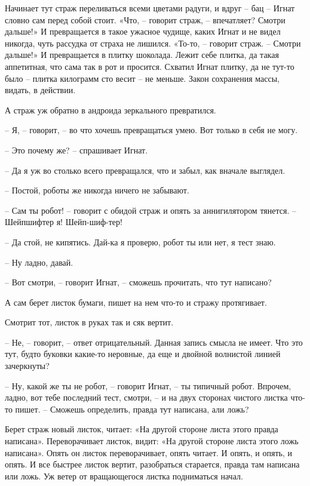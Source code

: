 \documentclass[ebook,oneside,final,openright]{memoir}
\begin{document}
Начинает тут страж переливаться всеми цветами радуги, и вдруг – бац – Игнат словно сам перед собой стоит. «Что, – говорит страж, – впечатляет? Смотри дальше!» И превращается в такое ужасное чудище, каких Игнат и не видел никогда, чуть рассудка от страха не лишился. «То-то, – говорит страж. – Смотри дальше!» И превращается в плитку шоколада. Лежит себе плитка, да такая аппетитная, что сама так в рот и просится. Схватил Игнат плитку, да не тут-то было – плитка килограмм сто весит – не меньше. Закон сохранения массы, видать, в действии. \par
\par
А страж уж обратно в андроида зеркального превратился. \par
– Я, – говорит, – во что хочешь превращаться умею. Вот только в себя не могу. \par
– Это почему же? – спрашивает Игнат.\par
– Да я уж во столько всего превращался, что и забыл, как вначале выглядел. \par
– Постой, роботы же никогда ничего не забывают. \par
– Сам ты робот! – говорит с обидой страж и опять за аннигилятором тянется. – Шейпшифтер я! Шейп-шиф-тер! \par
– Да стой, не кипятись. Дай-ка я проверю, робот ты или нет, я тест знаю. \par
– Ну ладно, давай. \par
– Вот смотри, – говорит Игнат, – сможешь прочитать, что тут написано? \par
А сам берет листок бумаги, пишет на нем что-то и стражу протягивает. \par
Смотрит тот, листок в руках так и сяк вертит. \par
– Не, – говорит, – ответ отрицательный. Данная запись смысла не имеет. Что это тут, будто буковки какие-то неровные, да еще и двойной волнистой линией зачеркнуты? \par
– Ну, какой же ты не робот, – говорит Игнат, – ты типичный робот. Впрочем, ладно, вот тебе последний тест, смотри, – и на двух сторонах чистого листка что-то пишет. – Сможешь определить, правда тут написана, али ложь? \par
\par
Берет страж новый листок, читает: «На другой стороне листа этого правда написана». Переворачивает листок, видит: «На другой стороне листа этого ложь написана». Опять он листок переворачивает, опять читает. И опять, и опять, и опять. И все быстрее листок вертит, разобраться старается, правда там написана или ложь. Уж ветер от вращающегося листка подниматься начал. \par
\end{document}
